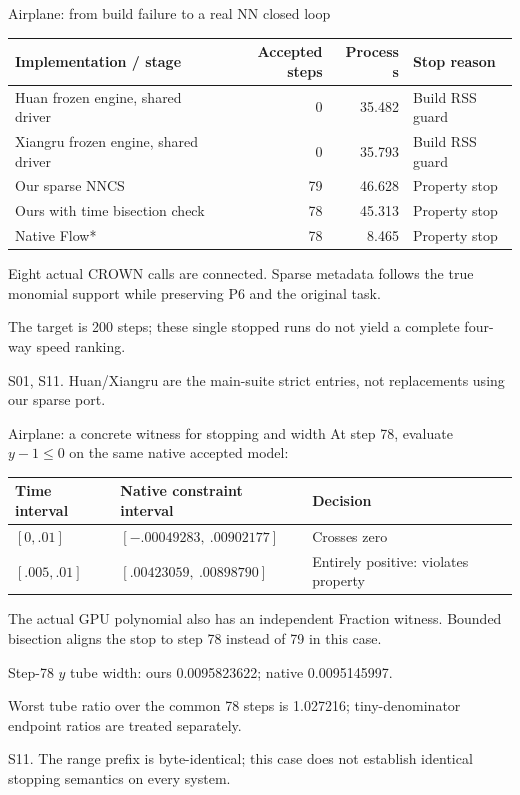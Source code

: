 \documentclass[aspectratio=169,11pt]{beamer}
\newcommand{\src}[1]{\par\vfill{\fontsize{7}{9}\selectfont\color{gray}#1\par}}
\begin{document}
\begin{frame}[t]{Airplane: from build failure to a real NN closed loop}
\relax
\relax
{\small\setlength{\tabcolsep}{3.2pt}\renewcommand{\arraystretch}{1.18}
\noindent\begin{tabular*}{\linewidth}{@{\extracolsep{\fill}}lrrl@{}}\toprule
\textbf{Implementation / stage} & \textbf{Accepted steps} & \textbf{Process s} & \textbf{Stop reason}\\ \midrule
Huan frozen engine, shared driver & 0 & 35.482 & Build RSS guard\\
Xiangru frozen engine, shared driver & 0 & 35.793 & Build RSS guard\\
Our sparse NNCS & 79 & 46.628 & Property stop\\
Ours with time bisection check & 78 & 45.313 & Property stop\\
Native Flow* & 78 & 8.465 & Property stop\\
\bottomrule\end{tabular*}\par{}}\vspace{0.3cm}Eight actual CROWN calls are connected. Sparse metadata follows the true monomial support while preserving P6 and the original task.\par{}The target is 200 steps; these single stopped runs do not yield a complete four-way speed ranking.
\src{S01, S11. Huan/Xiangru are the main-suite strict entries, not replacements using our sparse port.}
\end{frame}

\begin{frame}[t]{Airplane: a concrete witness for stopping and width}
\relax
\relax
At step 78, evaluate \(y-1\leq0\) on the same native accepted model:\par{}
{\small\renewcommand{\arraystretch}{1.18}\noindent\begin{tabularx}{\linewidth}{@{}p{3cm}p{6.1cm}X@{}}\toprule
\textbf{Time interval} & \textbf{Native constraint interval} & \textbf{Decision}\\\midrule
\([0,.01]\) & \([-.00049283,\ .00902177]\) & Crosses zero\\
\([.005,.01]\) & \([.00423059,\ .00898790]\) & Entirely positive: violates property\\
\bottomrule\end{tabularx}\par{}}\vspace{0.25cm}The actual GPU polynomial also has an independent Fraction witness. Bounded bisection aligns the stop to step 78 instead of 79 in this case.\par{}Step-78 \(y\) tube width: ours 0.0095823622; native 0.0095145997.\par{}Worst tube ratio over the common 78 steps is 1.027216; tiny-denominator endpoint ratios are treated separately.
\src{S11. The range prefix is byte-identical; this case does not establish identical stopping semantics on every system.}
\end{frame}
\end{document}
